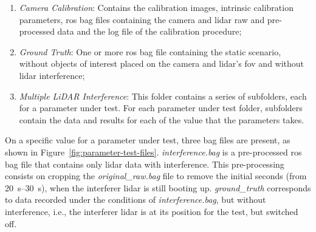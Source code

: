 \begin{enumerate}
\item \textit{Camera Calibration}: Contains the calibration images, intrinsic calibration parameters, \ac{ros} bag files containing the camera and \ac{lidar} raw and pre-processed data and the log file of the calibration procedure;
\item \textit{Ground Truth}: One or more \ac{ros} bag file containing the static scenario, without objects of interest placed on the camera and \ac{lidar}'s \ac{fov} and without \ac{lidar} interference;
\item \textit{Multiple LiDAR Interference}: This folder contains a series of subfolders, each for a parameter under test. For each parameter under test folder, subfolders contain the data and results for each of the value that the parameters takes.
\end{enumerate}

On a specific value for a parameter under test, three bag files are present, as shown in Figure~\ref{fig:parameter-test-files}. \textit{interference.bag} is a pre-processed \ac{ros} bag file that contains only \ac{lidar} data with interference. This pre-processing consists on cropping the \textit{original\_raw.bag} file to remove the initial seconds (from \SIrange{20}{30}{\second}), when the interferer \ac{lidar} is still booting up. \textit{ground\_truth} corresponds to data recorded under the conditions of \textit{interference.bag}, but without interference, i.e., the interferer \ac{lidar} is at its position for the test, but switched off.

